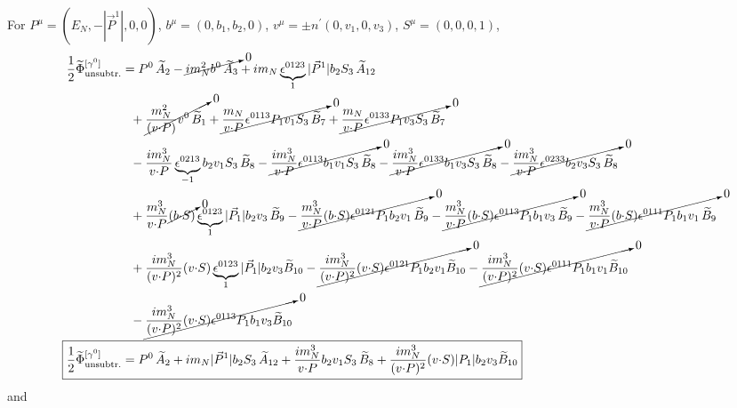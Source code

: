 \documentclass[]{article}
\numberwithin{equation}{section}
\newcommand{\tcdot}{{\cdot}}
\newcommand{\tAmp}{\widetilde{A}}
\newcommand{\tBmp}{\widetilde{B}}
\newcommand{\bvec}{b}
\newcommand{\mN}{m_N}
\newcommand{\unsub}{\text{unsubtr.}}
\begin{document}
For $P^{\mu}=(E_N, -|\vec{P}^1|,0,0)$, $b^{\mu}=(0,b_{1},b_{2},0)$, $v^{\mu}=\pm n^{\prime}(0,v_{1},0,v_{3})$, $S^{\mu}=(0,0,0,1)$,
\begin{align}
    \frac{1}{2}\widetilde \Phi^{[\gamma^{0}]}_{\unsub} & = 
		P^0\, \tAmp_2 - \cancelto{0}{i \mN^2 \bvec^0\, \tAmp_3}
		+ i \mN \underbrace{\epsilon^{0 123}}_{1} |\vec{P}^1| \bvec_2 S_3\, \tAmp_{12} \nonumber \\ &
		~~+ \cancelto{0}{\frac{\mN^2}{(v \tcdot P)} v^0\, \tBmp_1 }
		+ \cancelto{0}{\frac{\mN}{v \tcdot P} \epsilon^{0 113} P_1 v_1 S_3\, \tBmp_7  }+ \cancelto{0}{\frac{\mN}{v \tcdot P} \epsilon^{0 133} P_1 v_3 S_3\, \tBmp_7  }
		 \nonumber \\ &
		~~- \frac{ i \mN^3}{v \tcdot P} \underbrace{\epsilon^{0 213}}_{-1} \bvec_2 v_1 S_3\, \tBmp_8 - \cancelto{0}{\frac{ i \mN^3}{v \tcdot P}\epsilon^{0 113} \bvec_1 v_1 S_3\, \tBmp_8}- \cancelto{0}{\frac{ i \mN^3}{v \tcdot P}\epsilon^{0 133} \bvec_1 v_3 S_3\, \tBmp_8}- \cancelto{0}{\frac{ i \mN^3}{v \tcdot P}\epsilon^{0 233} \bvec_2 v_3 S_3\, \tBmp_8}\nonumber \\ &
		~~+ \frac{\mN^3}{v \tcdot P} \cancelto{0}{(\bvec \tcdot S)} \underbrace{\epsilon^{0 123}}_{1} |\vec{P}_1| \bvec_2 v_3\, \tBmp_9- \cancelto{0}{\frac{\mN^3}{v \tcdot P} (\bvec \tcdot S) \epsilon^{0 121} P_1 \bvec_2 v_1\, \tBmp_9}- \cancelto{0}{\frac{\mN^3}{v \tcdot P} (\bvec \tcdot S) \epsilon^{0 113} P_1 \bvec_1 v_3\, \tBmp_9}- \cancelto{0}{\frac{\mN^3}{v \tcdot P} (\bvec \tcdot S) \epsilon^{0 111} P_1 \bvec_1 v_1\, \tBmp_9}\nonumber \\ &
		~~+ \frac{i \mN^3}{(v \tcdot P)^2} (v \tcdot S) \underbrace{\epsilon^{0 123}}_{1} |\vec{P}_1| \bvec_2 v_3 \tBmp_{10}
		- \cancelto{0}{\frac{i \mN^3}{(v \tcdot P)^2} (v \tcdot S) \epsilon^{0 121} P_1 \bvec_2 v_1 \tBmp_{10}}- \cancelto{0}{\frac{i \mN^3}{(v \tcdot P)^2} (v \tcdot S) \epsilon^{0 111} P_1 \bvec_1 v_1 \tBmp_{10}}\nonumber \\ &
		~~- \cancelto{0}{\frac{i \mN^3}{(v \tcdot P)^2} (v \tcdot S) \epsilon^{0 113} P_1 \bvec_1 v_3 \tBmp_{10}}\\
  \Aboxed{ \frac{1}{2}\widetilde \Phi^{[\gamma^{0}]}_{\unsub}& = P^0\, \tAmp_2  + i \mN  |\vec{P}^1| \bvec_2 S_3\, \tAmp_{12}+ \frac{ i \mN^3}{v \tcdot P}  \bvec_2 v_1 S_3\, \tBmp_8+ \frac{i \mN^3}{(v \tcdot P)^2} (v \tcdot S)  |P_1| \bvec_2 v_3 \tBmp_{10}}
\end{align}
and
\end{document}
